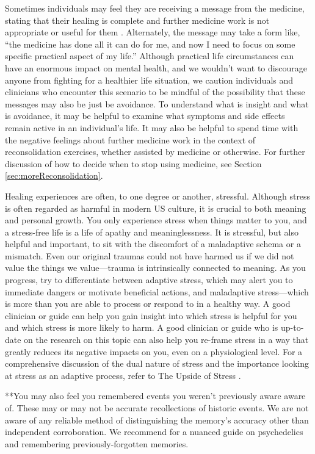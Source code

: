 \documentclass[12pt,letterpaper]{book}
\begin{document}
Sometimes individuals may feel they are receiving a message from the medicine, stating that their healing is complete and further medicine work is not appropriate or useful for them \cite{razviDissociation}. Alternately, the message may take a form like, “the medicine has done all it can do for me, and now I need to focus on some specific practical aspect of my life.” Although practical life circumstances can have an enormous impact on mental health, and we wouldn't want to discourage anyone from fighting for a healthier life situation, we caution individuals and clinicians who encounter this scenario to be mindful of the possibility that these messages may also be just be avoidance. To understand what is insight and what is avoidance, it may be helpful to examine what symptoms and side effects remain active in an individual's life. It may also be helpful to spend time with the negative feelings about further medicine work in the context of reconsolidation exercises, whether assisted by medicine or otherwise. For further discussion of how to decide when to stop using medicine, see Section \ref{sec:moreReconsolidation}.

Healing experiences are often, to one degree or another, stressful. Although stress is often regarded as harmful in modern US culture, it is crucial to both meaning and personal growth. You only experience stress when things matter to you, and a stress-free life is a life of apathy and meaninglessness. It is stressful, but also helpful and important, to sit with the discomfort of a maladaptive schema or a mismatch. Even our original traumas could not have harmed us if we did not value the things we value—trauma is intrinsically connected to meaning. As you progress, try to differentiate between adaptive stress, which may alert you to immediate dangers or motivate beneficial actions, and maladaptive stress—which is more than you are able to process or respond to in a healthy way. A good clinician or guide can help you gain insight into which stress is helpful for you and which stress is more likely to harm. A good clinician or guide who is up-to-date on the research on this topic can also help you re-frame stress in a way that greatly reduces its negative impacts on you, even on a physiological level. For a comprehensive discussion of the dual nature of stress and the importance looking at stress as an adaptive process, refer to The Upside of Stress \cite{mcgonigalStress}.

**You may also feel you remembered events you weren't previously aware aware of. These may or may not be accurate recollections of historic events. We are not aware of any reliable method of distinguishing the memory's accuracy other than independent corroboration. We recommend \textcite{psychedelicrecoveredmemory} for a nuanced guide on psychedelics and remembering previously-forgotten memories.
\end{document}
